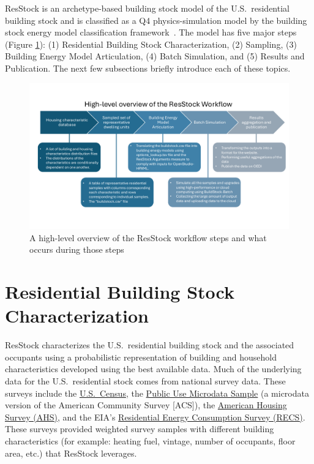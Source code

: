 ResStock is an archetype-based building stock model of the U.S.~residential building stock and is classified as a Q4 physics-simulation model by the building stock energy model classification framework~\citep{Langevin2020}. The model has five major steps (Figure \ref{fig:workflow_overview}): (1) Residential Building Stock Characterization, (2) Sampling, (3) Building Energy Model Articulation, (4) Batch Simulation, and (5) Results and Publication. The next few subsections briefly introduce each of these topics.

\begin{figure}
    \centering
    \includegraphics[width=1\linewidth]{images/ResStock-Workflow-Graphic-Simple.pdf}
    \caption{A high-level overview of the ResStock workflow steps and what occurs during those steps}
    \label{fig:workflow_overview}
\end{figure}

\section{Residential Building Stock Characterization}
ResStock characterizes the U.S.~residential building stock and the associated occupants using a probabilistic representation of building and household characteristics developed using the best available data. Much of the underlying data for the U.S.~residential stock comes from national survey data. These surveys include the \href{https://data.census.gov/}{U.S.~Census}, the \href{https://www.census.gov/programs-surveys/acs/microdata.html}{Public Use Microdata Sample} (a microdata version of the American Community Survey [ACS]), the \href{https://www.census.gov/programs-surveys/ahs.html}{American Housing Survey (AHS)}, and the EIA's \href{https://www.eia.gov/consumption/residential/}{Residential Energy Consumption Survey (RECS)}. These surveys provided weighted survey samples with different building characteristics (for example: heating fuel, vintage, number of occupants, floor area, etc.) that ResStock leverages.

